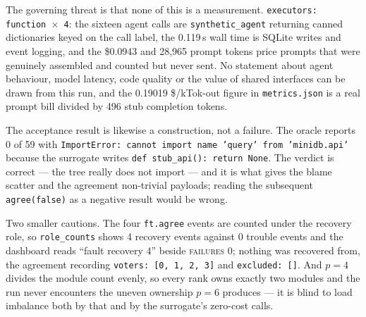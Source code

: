 \documentclass[11pt]{article}
\begin{document}
The governing threat is that none of this is a measurement. \texttt{executors: function
$\times$ 4}: the sixteen agent calls are \texttt{synthetic\_agent} returning canned
dictionaries keyed on the call label, the 0.119\,s wall time is SQLite writes and event
logging, and the \$0.0943 and 28{,}965 prompt tokens price prompts that were genuinely
assembled and counted but never sent. No statement about agent behaviour, model latency, code
quality or the value of shared interfaces can be drawn from this run, and the 0.19019
\$/kTok-out figure in \texttt{metrics.json} is a real prompt bill divided by 496 stub
completion tokens.

The acceptance result is likewise a construction, not a failure. The oracle reports 0 of 59
with \texttt{ImportError: cannot import name 'query' from 'minidb.api'} because the surrogate
writes \texttt{def stub\_api(): return None}. The verdict is correct --- the tree really does
not import --- and it is what gives the blame scatter and the agreement non-trivial payloads;
reading the subsequent \texttt{agree(false)} as a negative result would be wrong.

Two smaller cautions. The four \texttt{ft.agree} events are counted under the recovery role, so
\texttt{role\_counts} shows 4 recovery events against 0 trouble events and the dashboard reads
``fault recovery 4'' beside \textsc{failures} 0; nothing was recovered from, the agreement
recording \texttt{voters: [0, 1, 2, 3]} and \texttt{excluded: []}. And $p = 4$ divides the
module count evenly, so every rank owns exactly two modules and the run never encounters the
uneven ownership $p = 6$ produces --- it is blind to load imbalance both by that and by the
surrogate's zero-cost calls.
\end{document}
